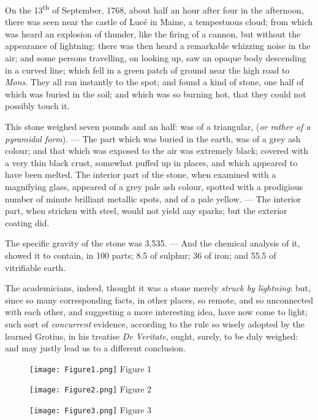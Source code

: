 \documentclass[a4paper, 12pt, oneside]{article}
\begin{document}
On the 13\textsuperscript{th} of September, 1768, about half an hour after four in the afternoon, there was seen near the castle of Lucé in Maine, a tempestuous cloud; from which was heard an explosion of thunder, like the firing of a cannon, but without the appearance of lightning: there was then heard a remarkable whizzing noise in the air; and some persons travelling, on looking up, saw an opaque body descending in a curved line; which fell in a green patch of ground near the high road to \emph{Mons}. They all ran instantly to the spot; and found a kind of stone, one half of which was buried in the soil; and which was so burning hot, that they could not possibly touch it.

This stone weighed seven pounds and an half: was of a triangular, (\emph{or rather of a pyramidal form}). --- The part which was buried in the earth, was of a grey ash colour; and that which was exposed to the air was extremely black; covered with a very thin black crust, somewhat puffed up in places, and which appeared to have been melted. The interior part of the stone, when examined with a magnifying glass, appeared of a grey pale ash colour, spotted with a prodigious number of minute brilliant metallic spots, and of a pale yellow. --- The interior part, when stricken with steel, would not yield any sparks; but the exterior coating did.

The specific gravity of the stone was 3,535. --- And the chemical analysis of it, showed it to contain, in 100 parts; 8.5 of sulphur; 36 of iron; and 55.5 of vitrifiable earth.

The academicians, indeed, thought it was a stone merely \emph{struck by lightning}: but, since so many corresponding facts, in other places, so remote, and so unconnected with each other, and suggesting a more interesting idea, have now come to light; such sort of \emph{concurrent} evidence, according to the rule so wisely adopted by the learned Grotius, in his treatise \emph{De Veritate}, ought, surely, to be duly weighed: and may justly lead us to a different conclusion.
\clearpage
\pagestyle{fancy}
\fancyhf{}
\cfoot{\Fontauri{\thepage}}
\begin{figure}[b]
\centering
\texttt{[image: Figure1.png]}
\Fontauri
Figure 1
\end{figure}
\begin{figure}[b]
\centering
\texttt{[image: Figure2.png]}
\Fontauri
Figure 2
\end{figure}
\begin{figure}[b]
\centering
\texttt{[image: Figure3.png]}
\Fontauri
Figure 3
\end{figure}

\clearpage
\end{document}
